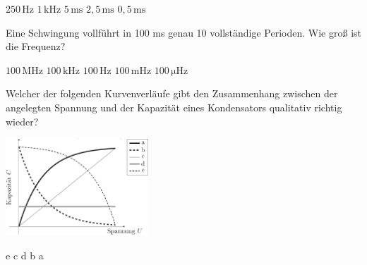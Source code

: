 \documentclass[11pt]{exam}
\begin{document}
\begin{questions}
\begin{choices}
	\choice \(\mathrm{250\,Hz}\)
	\choice \(\mathrm{1\,kHz}\)
	\choice \(\mathrm{5\,ms}\)
	\choice \(\mathrm{2,5\,ms}\)
	\choice \(\mathrm{0,5\,ms}\)
\end{choices}

\vspace{3mm}\question Eine Schwingung vollführt in 100 ms genau 10 vollständige Perioden. Wie groß ist die Frequenz?

\begin{choices}
	\choice \(\mathrm{100\,MHz}\)
	\choice \(\mathrm{100\,kHz}\)
	\choice \(\mathrm{100\,Hz}\)
	\choice \(\mathrm{100\,mHz}\)
	\choice \(\mathrm{100\,\mu Hz}\)
\end{choices}

\vspace{3mm}\question Welcher der folgenden Kurvenverläufe gibt den Zusammenhang zwischen der angelegten Spannung und der Kapazität eines Kondensators qualitativ richtig wieder? 

\includegraphics[width=0.4\textwidth]{images/Kondensator-C-U.png}

\begin{choices}
	\choice e
	\choice c
	\choice d
	\choice b
	\choice a
\end{choices}

\vspace{3mm}\end{questions}
\end{document}
